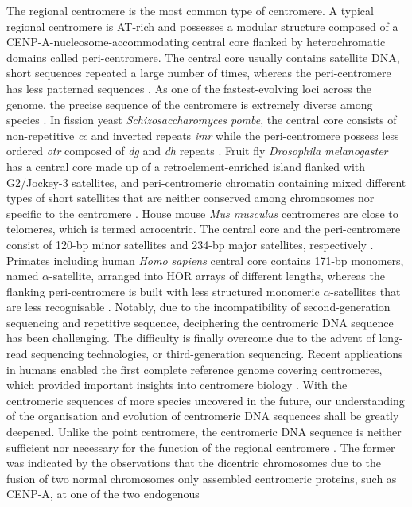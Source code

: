 The regional centromere is the most common type of centromere. A typical regional centromere is AT-rich and possesses a modular structure composed of a CENP-A-nucleosome-accommodating central core flanked by heterochromatic domains called peri-centromere. The central core usually contains satellite DNA, short sequences repeated a large number of times, whereas the peri-centromere has less patterned sequences \citep{Talbert2020WhatCentromere, McKinley2015TheFunction, Wong2020LessonsChromosomes, Muller2019TheArchitecture}. As one of the fastest-evolving loci across the genome, the precise sequence of the centromere is extremely diverse among species \citep{Melters2013ComparativeEvolution}. In fission yeast \textit{Schizosaccharomyces pombe}, the central core consists of non-repetitive \textit{cc} and inverted repeats \textit{imr} while the peri-centromere possess less ordered \textit{otr} composed of \textit{dg} and \textit{dh} repeats \citep{Chikashige1989CompositeSites, Clarke1993StructureCentromeres, Murakami1991StructureRegion, Nakaseko1986ChromosomeYeast, Nakaseko1987AChromosomes., Steiner1993CentromeresLoci}. Fruit fly \textit{Drosophila melanogaster} has a central core made up of a retroelement-enriched island flanked with G2/Jockey-3 satellites, and peri-centromeric chromatin containing mixed different types of short satellites that are neither conserved among chromosomes nor specific to the centromere \citep{Talbert2018SimpleSpecies, Wong2020LessonsChromosomes, Chang2019IslandsCentromeres}. House mouse \textit{Mus musculus} centromeres are close to telomeres, which is termed acrocentric. The central core and the peri-centromere consist of 120-bp minor satellites and 234-bp major satellites, respectively \citep{Komissarov2011TandemlyGenome, Kuznetsova2006High-resolutionDNA}. Primates including human \textit{Homo sapiens} central core contains 171-bp monomers, named $\alpha$-satellite, arranged into HOR arrays of different lengths, whereas the flanking peri-centromere is built with less structured monomeric $\alpha$-satellites that are less recognisable \citep{Maio1971DNAAethiops, Rosenberg1978HighlySIMIANSIMIANSIMIANSIMIANSIMIAN, Manuelidis1978ComplexDNAs, Manuelidis1978ChromosomalDNAs, Aldrup-MacDonald2014TheGenomics, Logsdon2021The8}. Notably, due to the incompatibility of second-generation sequencing and repetitive sequence, deciphering the centromeric DNA sequence has been challenging. The difficulty is finally overcome due to the advent of long-read sequencing technologies, or third-generation sequencing. Recent applications in humans enabled the first complete reference genome covering centromeres, which provided important insights into centromere biology \citep{Logsdon2021The8, Nurk2022TheGenome, Logsdon2022TheDNA}. With the centromeric sequences of more species uncovered in the future, our understanding of the organisation and evolution of centromeric DNA sequences shall be greatly deepened. Unlike the point centromere, the centromeric DNA sequence is neither sufficient nor necessary for the function of the regional centromere \citep{McKinley2015TheFunction}. The former was indicated by the observations that the dicentric chromosomes due to the fusion of two normal chromosomes only assembled centromeric proteins, such as CENP-A, at one of the two endogenous 